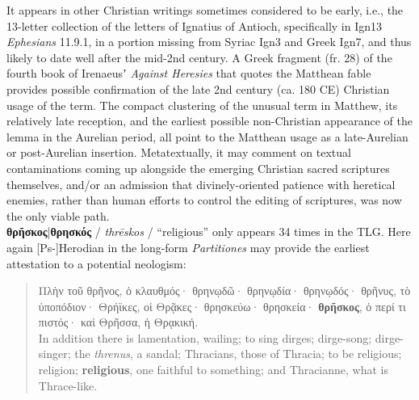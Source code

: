 It appears in other Christian writings sometimes considered to be early, %
i.e., the 13-letter collection of the letters of Ignatius of Antioch, %
specifically in Ign13 \textit{Ephesians} 11.9.1, in a portion missing from Syriac Ign3 and Greek Ign7, %
and thus likely to date well after the mid-2nd century. %
A Greek fragment (fr. 28) of the fourth book of Irenaeusʼ \textit{Against Heresies} %
that quotes the Matthean fable provides possible confirmation %
of the late 2nd century (ca. 180 CE) Christian usage of the term. %
The compact clustering of the unusual term in Matthew, %
its relatively late reception, %
and the earliest possible non-Christian appearance of the lemma in the Aurelian period, %
all point to the Matthean usage as a late-Aurelian or post-Aurelian insertion. %
Metatextually, it may comment on textual contaminations coming up alongside %
the emerging Christian sacred scriptures themselves, %
and/or an admission that divinely-oriented patience with heretical enemies, %
rather than human efforts to control the editing of scriptures, %
was now the only viable path. \\[1.5mm] %

\noindent{}\textbf{θρῆσκος}|\textbf{θρησκός} / \textit{thrēskos} / “religious” %
only appears 34 times in the TLG. %
Here again [Ps-]Herodian in the long-form \textit{Partitiones} may provide %
the earliest attestation to a potential neologism: %

\vspace*{3mm} 
 \begin{quote}Πλὴν τοῦ θρῆνος, ὁ κλαυθμός· θρηνῳδῶ· θρηνῳδία· %
 θρηνῳδός· θρῆνυς, τὸ ὑποπόδιον· Θρήϊκες, οἱ Θρᾷκες· θρησκεύω· %
 θρησκεία· \textbf{θρῆσκος}, ὁ περί τι πιστός· καὶ Θρῆσσα, ἡ Θρᾳκική. \\[1mm] %
 In addition there is lamentation, wailing; to sing dirges; dirge-song; %
 dirge-singer; the \textit{threnus}, a sandal; Thracians, those of Thracia; %
 to be religious; religion; \textbf{religious}, one faithful to something; and Thracianne, %
 what is Thrace-like. \end{quote} %
 \vspace*{3mm} 

